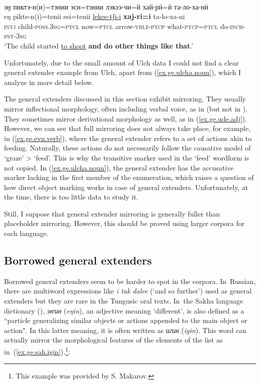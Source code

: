 \documentclass[output=paper,colorlinks,citecolor=brown
\ChapterDOI{10.5281/zenodo.15697577}
]{langscibook}
\begin{document}
 \ea \label{ex.ge.nanai.verb}
 \\
\glll эӈ пиктэ-н(и)=тэнии эси=тэнии лэкээ-чи=й хай-рӥ=ӥ та-ло-ха-нӥ\\
eŋ pikte-n(i)=tenii esi=tenii \uline{lekee-tʃi-i} \textbf{xaj-ri=i} ta-lo-xa-ni\\
\textsc{intj} child-\textsc{poss.3sg}=\textsc{ptcl} now=\textsc{ptcl} arrow-\textsc{vblz}-\textsc{ptcp} what-\textsc{ptcp}=\textsc{ptcl} do-\textsc{inch}-\textsc{pst}-\textsc{3sg}\\
\glt `The child started \uline{to shoot} \textbf{and do other things like that}.' \\
 \z
{}

Unfortunately, due to the small amount of Ulch data I could not find a clear general extender example from Ulch, apart from (\ref{ex.ge.ulcha.noun}), which I analyze in more detail below.

The general extenders discussed in this section exhibit mirroring. They usually mirror inflectional morphology, often including verbal voice, as in  (but not in ). They sometimes mirror derivational morphology as well, as in (\ref{ex.ge.ude.adj}). However, we can see that full mirroring does not always take place, for example, in (\ref{ex.ge.evn.verb}), where the general extender refers to a set of actions akin to feeding. Naturally, these actions do not necessarily follow the causative model of `graze' > `feed'. This is why the transitive marker used in the `feed' wordform is not copied. In (\ref{ex.ge.ulcha.noun}), the general extender has the accusative marker lacking in the first member of the enumeration, which raises a question of how direct object marking works in case of general extenders. Unfortunately, at the time, there is too little data to study it.

Still, I suppose that general extender mirroring is generally fuller than placeholder mirroring. However, this should be proved using larger corpora for each language.

\subsection{Borrowed general extenders}

Borrowed general extenders seem to be harder to spot in the corpora. In~Russian, there are multiword expressions like \textit{i tak dalee} (`and so further') used as general extenders but they are rare in the Tungusic oral texts. In~the Sakha language dictionary (\cite{sakhatyla}), \textit{эҥин} (\textit{eŋin}), an adjective meaning `different', is also defined as a ``particle generalizing similar objects or actions appended to the main object or action". In this latter meaning, it is often written as \textit{игин} (\textit{igin}). This word can actually mirror the morphological features of the elements of the list as in~(\ref{ex.ge.sah.igin}).\footnote{This example was provided by S. Makarov.}:
\end{document}
